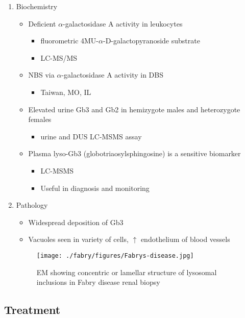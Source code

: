 \documentclass{scrartcl}
\begin{document}
\begin{enumerate}
\item Biochemistry
\label{sec:org32fe964}
\begin{itemize}
\item Deficient \(\alpha\)-galactosidase A activity in leukocytes
\begin{itemize}
\item fluorometric 4MU-\(\alpha\)-D-galactopyranoside substrate
\item LC-MS/MS
\end{itemize}
\item NBS via \(\alpha\)-galactosidase A activity in DBS
\begin{itemize}
\item Taiwan, MO, IL
\end{itemize}
\item Elevated urine Gb3 and Gb2 in hemizygote males and heterozygote females
\begin{itemize}
\item urine and DUS LC-MSMS assay
\end{itemize}
\item Plasma lyso-Gb3 (globotriaosylsphingosine) is a sensitive biomarker
\begin{itemize}
\item LC-MSMS
\item Useful in diagnosis and monitoring
\end{itemize}
\end{itemize}

\item Pathology
\label{sec:org5feca99}

\begin{itemize}
\item Widespread deposition of Gb3
\item Vacuoles seen in variety of cells, \(\uparrow\) endothelium of blood vessels
\end{itemize}

\begin{figure}[htbp]
\centering
\texttt{[image: ./fabry/figures/Fabrys-disease.jpg]}
\caption[Fabry EM]{\label{fig:org6747ae1}
EM showing concentric or lamellar structure of lysosomal inclusions in Fabry disease renal biopsy}
\end{figure}
\end{enumerate}

\subsection{Treatment}
\label{sec:org22f4a6e}
\end{document}
